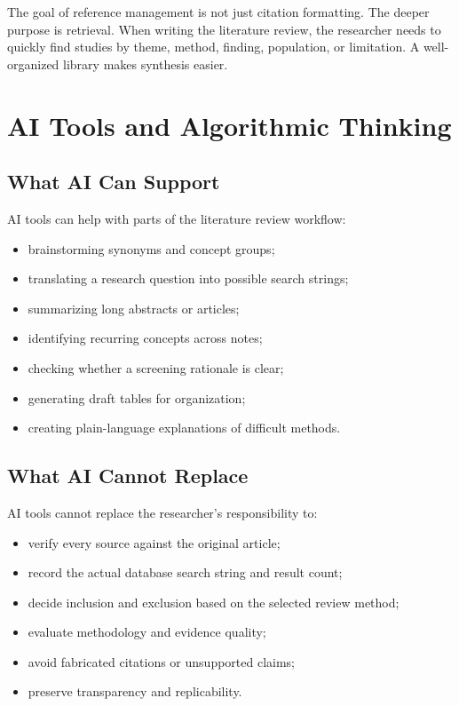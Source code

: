 \documentclass[11pt,letterpaper]{article}
\begin{document}
The goal of reference management is not just citation formatting. The deeper purpose is retrieval. When writing the literature review, the researcher needs to quickly find studies by theme, method, finding, population, or limitation. A well-organized library makes synthesis easier.

\section{AI Tools and Algorithmic Thinking}

\subsection{What AI Can Support}

AI tools can help with parts of the literature review workflow:

\begin{itemize}
  \item brainstorming synonyms and concept groups;
  \item translating a research question into possible search strings;
  \item summarizing long abstracts or articles;
  \item identifying recurring concepts across notes;
  \item checking whether a screening rationale is clear;
  \item generating draft tables for organization;
  \item creating plain-language explanations of difficult methods.
\end{itemize}

\subsection{What AI Cannot Replace}

AI tools cannot replace the researcher's responsibility to:

\begin{itemize}
  \item verify every source against the original article;
  \item record the actual database search string and result count;
  \item decide inclusion and exclusion based on the selected review method;
  \item evaluate methodology and evidence quality;
  \item avoid fabricated citations or unsupported claims;
  \item preserve transparency and replicability.
\end{itemize}
\end{document}
